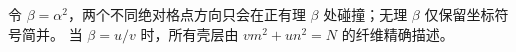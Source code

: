 \documentclass[10pt]{article}
\begin{document}
{{令 $\beta=\alpha^2$，两\hspace{0pt}个\hspace{0pt}不\hspace{0pt}同\hspace{0pt}绝\hspace{0pt}对\hspace{0pt}格\hspace{0pt}点\hspace{0pt}方\hspace{0pt}向\hspace{0pt}只\hspace{0pt}会\hspace{0pt}在\hspace{0pt}正\hspace{0pt}有\hspace{0pt}理 $\beta$ 处\hspace{0pt}碰\hspace{0pt}撞；无\hspace{0pt}理 $\beta$ 仅\hspace{0pt}保\hspace{0pt}留\hspace{0pt}坐\hspace{0pt}标\hspace{0pt}符\hspace{0pt}号\hspace{0pt}简\hspace{0pt}并。\allowbreak
当 $\beta=u/v$ 时，所\hspace{0pt}有\hspace{0pt}壳\hspace{0pt}层\hspace{0pt}由 $vm^2+un^2=N$ 的\hspace{0pt}纤\hspace{0pt}维\hspace{0pt}精\hspace{0pt}确\hspace{0pt}描\hspace{0pt}述。\allowbreak
}}
\end{document}
